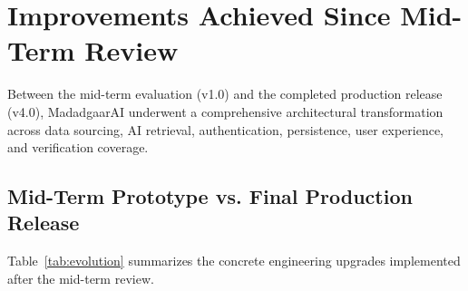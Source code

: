 \documentclass[12pt,a4paper,oneside]{report}
\begin{document}
\chapter[Improvements Since Mid-Term]{Improvements Achieved Since Mid-Term Review}

Between the mid-term evaluation (v1.0) and the completed production release (v4.0), MadadgaarAI underwent a comprehensive architectural transformation across data sourcing, AI retrieval, authentication, persistence, user experience, and verification coverage.

\section{Mid-Term Prototype vs. Final Production Release}
Table~\ref{tab:evolution} summarizes the concrete engineering upgrades implemented after the mid-term review.
\end{document}
